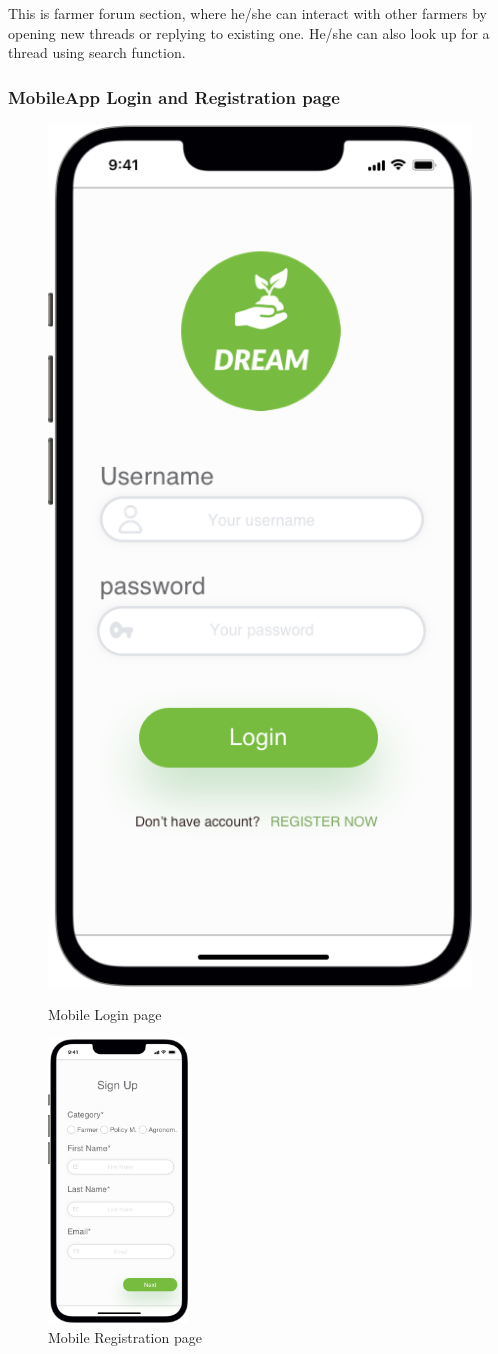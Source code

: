 This is farmer forum section, where he/she can interact with other farmers by opening new threads or replying to existing one.
He/she can also look up for a thread using search function.

\subsubsection{MobileApp Login and Registration page}

  \vspace*{-0.3cm}
\begin{figure}[H]
  \begin{minipage}{0.5\textwidth}
  \centering
    \includegraphics[width=37.mm,scale=0.9]{./Images//Mocks/Mobile/Login.png}
    \vspace*{-0.3cm}
    \caption{Mobile Login page}
    \end{minipage}
\hfill
   \begin{minipage}{0.5\textwidth}
     \centering
     \includegraphics[width=37mm,scale=0.9]{./Images//Mocks/Mobile/Registration.png}
     \vspace*{-0.3cm}
     \caption{Mobile Registration page}
   \end{minipage}
\end{figure}

